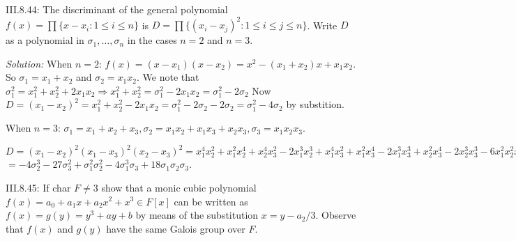 \documentclass{letter}
\newcommand{\tmem}[1]{{\em #1\/}}
\begin{document}
III.8.44: The discriminant of the general polynomial $f (x) = \prod \{x - x_i
: 1 \leq i \leq n\}$ is $D = \prod \{(x_i - x_j)^2 : 1 \leq i \leq j \leq
n\}$. Write $D$ as a polynomial in $\sigma_1, \ldots, \sigma_n$ in the cases
$n = 2$ and $n = 3$.

{\tmem{Solution:}} When $n = 2$: $f (x) = (x - x_1) (x - x_2) = x^2 - (x_1 +
x_2) x + x_1 x_2$. So $\sigma_1 = x_1 + x_2$ and $\sigma_2 = x_1 x_2$. We note
that $\sigma^2_1 = x_1^2 + x^2_2 + 2 x_1 x_2 \Rightarrow x_1^2 + x_2^2 =
\sigma^2_1 - 2 x_1 x_2 = \sigma_1^2 - 2 \sigma_2$ Now $D = (x_1 - x_2)^2 =
x_1^2 + x^2_2 - 2 x_1 x_2 = \sigma^2_1 - 2 \sigma_2 - 2 \sigma_2 = \sigma_1^2
- 4 \sigma_2$ by substition.

When $n = 3$: $\sigma_1 = x_1 + x_2 + x_3, \sigma_2 = x_1 x_2 + x_1 x_3 + x_2
x_3, \sigma_3 = x_1 x_2 x_3$.

$D = (x_1 - x_2)^2 (x_1 - x_3)^2 (x_2 - x_3)^2 = x_1^4 x_2^2 + x_1^2 x_2^4 +
x_2^4 x_3^2 - 2 x_1^3 x_2^3 + x_1^4 x_3^2 + x_1^2 x_3^4 - 2 x_1^3 x_3^3 +
x_2^2 x_3^4 - 2 x_2^3 x_3^3 - 6 x_1^2 x_2^2 x_3^2 + 2 x_1^3 x_2^2 x_3 - 2 x_1
x_2^4 x_3 + 2 x_1^2 x_2^3 x_3 + 2 x_1 x_2^2 x_3^3 + 2 x_1^3 x_2 x_3^2 - 2 x_1
x_2 x_3^4 + 2 x_1^2 x_2 x_3^3 - 2 x_1^4 x_2 x_3 + 2 x_1 x_2^3 x_3^2
= - 4 x_1^3 x_2^3 - 4 x_2^3 x_3^3 - 4 x_1^3 x_3^3 - 12 x_1^2 x_2^3 x_3 - 12
x_1^3 x_2^2 x_3 - 12 x_1 x_2^3 x_3^2 - 24 x_1^2 x_2^2 x_3^2 - 12 x_1^3 x_2
x_3^2 - 12 x_1 x_2^2 x_3^3 - 12 x_1^2 x_2 x_3^3 - 27 x_1^2 x_2^2 x_3^2 + x_1^4
x_2^2 + x_1^4 x_3^2 + x_1^2 x_2^4 + x_2^4 x_3^2 + 2 x_1^3 x_2^3 + 2 x_2^3
x_3^3 + 2 x_1^3 x_3^3 + x_1^2 x_3^4 + x_2^2 x_3^4 + 8 x_1^3 x_2^2 x_3 + 2
x_1^4 x_2 x_3 + 15 x_1^2 x_2^2 x_3^2 + 8 x_1^3 x_2 x_3^2 + 2 x_1 x_2^4 x_3 + 8
x_1^2 x_2^3 x_3 + 8 x_1 x_2^3 x_3^2  + 8 x_1 x_2^2 x_3^3 + 8 x_1^2 x_2
x_3^3 + 2 x_1 x_2 x_3^4 - 4 x_1^4 x_2 x_3 - 4 x_1 x_2^4 x_3 - 4 x_1 x_2 x_3^4
- 12 x_1^2 x_2^3 x_3 - 12 x_1^2 x_2 x_3^3 - 12 x_1^3 x_2^2 x_3 - 24 x_1^2
x_2^2 x_3^2 - 12 x_1^3 x_2 x_3^2 - 12 x_1 x_2^2 x_3^3 - 12 x_1 x_2^3 x_3^2 +
18 x_1^3 x_2^2 x_3 + 18 x_1^3 x_2 x_3^2 + 18 x_1^2 x_2^3 x_3 + 18 x_1 x_2^3
x_3^2 + 18 x_1^2 x_2 x_3^3 + 18 x_1 x_2^2 x_3^3 + 54 x_1^2 x_2^2 x_3^2 $
$= - 4 \sigma_2^3 - 27 \sigma_3^2 + \sigma_1^2 \sigma_2^2 - 4 \sigma_1^3
\sigma_3 + 18 \sigma_1 \sigma_2 \sigma_3$.

III.8.45: If char $F \neq 3$ show that a monic cubic polynomial $f (x) = a_0
+ a_1 x + a_2 x^2 + x^3 \in F [x]$ can be written as $f (x) = g (y) = y^3 + a
y + b$ by means of the substitution $x = y - a_2 / 3$. Observe that $f (x)$
and $g (y)$ have the same Galois group over $F$.
\end{document}
